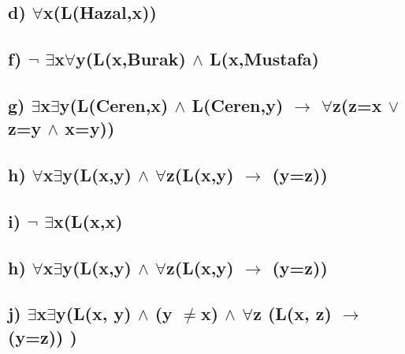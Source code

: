 \documentclass[12pt]{article}
\begin{document}
\subsection*{d) $\forall$x(L(Hazal,x))}
\subsection*{f) $\neg$ $\exists$x$\forall$y(L(x,Burak) $\land$ L(x,Mustafa)}
\subsection*{g) $\exists$x$\exists$y(L(Ceren,x) $\land$ L(Ceren,y) $\rightarrow$ $\forall$z(z=x $\lor$ z=y $\land$ x=y))}
\subsection*{h) $\forall$x$\exists$y(L(x,y) $\land$ $\forall$z(L(x,y) $\rightarrow$ (y=z))}
\subsection*{i) $\neg$ $\exists$x(L(x,x)}
\subsection*{h) $\forall$x$\exists$y(L(x,y) $\land$ $\forall$z(L(x,y) $\rightarrow$ (y=z))}
\subsection*{j) $\exists$x$\exists$y(L(x, y) $\land$ (y $\ne$x) $\land$ $\forall$z (L(x, z) $\to$ (y=z)) )}
\end{document}
